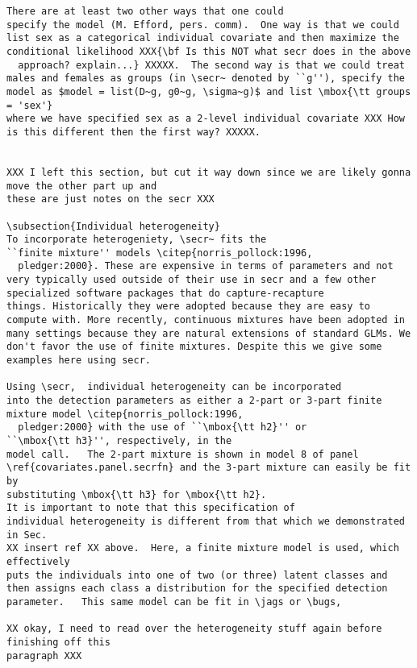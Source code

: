 {\begin{verbatim}
There are at least two other ways that one could
specify the model (M. Efford, pers. comm).  One way is that we could
list sex as a categorical individual covariate and then maximize the
conditional likelihood XXX{\bf Is this NOT what secr does in the above
  approach? explain...} XXXXX.  The second way is that we could treat males and females as groups (in \secr~ denoted by ``g''), specify the
model as $model = list(D~g, g0~g, \sigma~g)$ and list \mbox{\tt groups = 'sex'}
where we have specified sex as a 2-level individual covariate XXX How
is this different then the first way? XXXXX.  


XXX I left this section, but cut it way down since we are likely gonna move the other part up and 
these are just notes on the secr XXX

\subsection{Individual heterogeneity}
To incorporate heterogeniety, \secr~ fits the
``finite mixture'' models \citep{norris_pollock:1996,
  pledger:2000}. These are expensive in terms of parameters and not
very typically used outside of their use in secr and a few other
specialized software packages that do capture-recapture
things. Historically they were adopted because they are easy to
compute with. More recently, continuous mixtures have been adopted in
many settings because they are natural extensions of standard GLMs. We
don't favor the use of finite mixtures. Despite this we give some
examples here using secr.

Using \secr,  individual heterogeneity can be incorporated
into the detection parameters as either a 2-part or 3-part finite
mixture model \citep{norris_pollock:1996,
  pledger:2000} with the use of ``\mbox{\tt h2}'' or
``\mbox{\tt h3}'', respectively, in the
model call.   The 2-part mixture is shown in model 8 of panel
\ref{covariates.panel.secrfn} and the 3-part mixture can easily be fit by
substituting \mbox{\tt h3} for \mbox{\tt h2}.  
It is important to note that this specification of
individual heterogeneity is different from that which we demonstrated in Sec. 
XX insert ref XX above.  Here, a finite mixture model is used, which effectively
puts the individuals into one of two (or three) latent classes and
then assigns each class a distribution for the specified detection
parameter.   This same model can be fit in \jags or \bugs, 

XX okay, I need to read over the heterogeneity stuff again before finishing off this 
paragraph XXX



\end{verbatim}}

